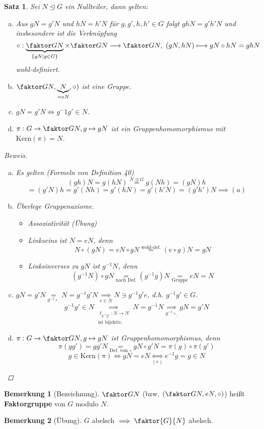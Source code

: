 \documentclass[a4paper]{report}
\theoremstyle{plain}
\newtheorem{satz}[thm]{Satz}
\theoremstyle{definition}
\newtheorem*{bem*}{Bemerkung}
\begin{document}
\begin{satz}
  Sei $N \trianglelefteq G$ ein Nullteiler, dann gelten:
  \begin{enumerate}[(a)]
    \item Aus $gN = g'N$ und $hN = h'N$ für $g, g', h, h' \in G$ folgt $ghN = g'h'N$ und insbesondere ist die Verknüpfung $$\circ : \underbrace{\faktor GN}_{\{gN \mid g \in G\}} \times \faktor GN \longrightarrow \faktor GN,\  (gN, hN) \longmapsto gN \circ hN = ghN$$
          wohl-definiert.
    \item $\faktor GN, \underbrace{N}_{=eN}, \circ)$ ist eine Gruppe.
    \item $gN = g'N \iff g^-1g' \in N$.
    \item $\pi : G \to \faktor GN, g \mapsto gN$ ist ein Gruppenhomomorphismus mit $\mathrm{Kern}(\pi) = N$.
  \end{enumerate}
\begin{proof}[Beweis]
\begin{enumerate}[(a)]
  \item Es gelten (Formeln von Definition 40)
        $$(gh)N = g(hN) \overset{N \trianglelefteq G}= g(Nh) = (gN)h$$
        $$= (g'N)h = g'(Nh) = g'(hN) = g'(h'N) = (g'h')N \implies (a)$$
  \item Überlege Gruppenaxiome.
\begin{itemize}
  \item Assoziativität (Übung)
  \item Linkseins ist $N = eN$, denn
        $$N \circ(gN) = eN\circ gN \overset{\text{wohl-def.}} = (e \circ g)N = gN$$
  \item Linksinverses zu $gN$ ist $g^{-1}N$, denn
        $$(g^{-1}N)\circ gN \underset{\text{nach Def.}}= (g^{-1}g)N \underset{\text{Gruppe}}= eN = N$$
\end{itemize}
  \item  $gN = g'N \underset{g^{-1}\circ \underline{\ }}= N = g^{-1}g'N \underset{e \in N}\implies N \ni g^{-1}g'e$, d.h. $g^{-1}g' \in G$.
        $$g^{-1}g' \in N \underset{\substack{\ell_{g^{-1}g'} : N \to N\\ \text{ist bijektiv.}}}\implies N = g^{-1}N \underset{g^{-1}\circ \underline{\ }}\implies gN= g'N$$
  \item $\pi : G \to \faktor GN, g \mapsto gN$ ist Gruppenhomomorphismus, denn $$\pi(gg') = gg'N \underset{\text{Def. von } \circ} = gN \circ g'N = \pi(g)\circ \pi(g')$$
        $$g \in \mathrm{Kern}(\pi) \iff gN = eN \underset{(c)}\iff e^{-1}g = g \in N$$
\end{enumerate}
\end{proof}
\end{satz}
\begin{bem*}[Bezeichnung] $\faktor GN$ (bzw. $(\faktor GN, eN, \circ)$) heißt \textbf{Faktorgruppe} von $G$ modulo $N$.
\end{bem*}
\begin{bem*}[Übung]
$G$ abelsch $\implies \faktor{G}{N}$ abelsch.
\end{bem*}
\end{document}
